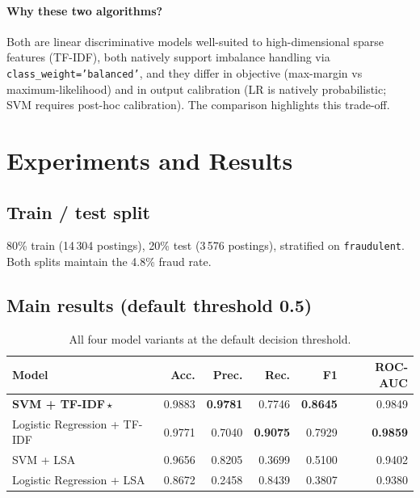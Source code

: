 \documentclass[11pt,a4paper]{article}
\newcommand{\code}[1]{\texttt{\small #1}}
\begin{document}
\paragraph{Why these two algorithms?} Both are linear discriminative models
well-suited to high-dimensional sparse features (TF-IDF), both natively
support imbalance handling via \code{class\_weight='balanced'}, and they
differ in objective (max-margin vs maximum-likelihood) and in output
calibration (LR is natively probabilistic; SVM requires post-hoc
calibration). The comparison highlights this trade-off.

\section{Experiments and Results}

\subsection{Train / test split}

80\% train (14\,304 postings), 20\% test (3\,576 postings), stratified on
\code{fraudulent}. Both splits maintain the 4.8\% fraud rate.

\subsection{Main results (default threshold 0.5)}

\begin{table}[H]
\centering
\caption{All four model variants at the default decision threshold.}
\label{tab:main}
\begin{tabular}{l r r r r r}
\toprule
\textbf{Model} & \textbf{Acc.} & \textbf{Prec.} & \textbf{Rec.} & \textbf{F1} & \textbf{ROC-AUC} \\
\midrule
\textbf{SVM + TF-IDF}\,$\star$        & 0.9883 & \textbf{0.9781} & 0.7746 & \textbf{0.8645} & 0.9849 \\
Logistic Regression + TF-IDF          & 0.9771 & 0.7040          & \textbf{0.9075} & 0.7929 & \textbf{0.9859} \\
SVM + LSA                             & 0.9656 & 0.8205          & 0.3699          & 0.5100 & 0.9402 \\
Logistic Regression + LSA             & 0.8672 & 0.2458          & 0.8439          & 0.3807 & 0.9380 \\
\bottomrule
\end{tabular}
\end{table}
\end{document}
